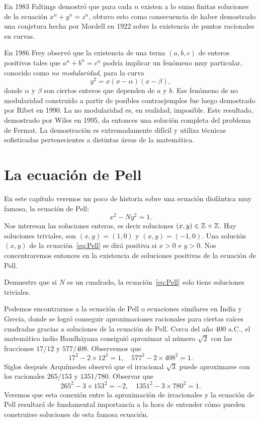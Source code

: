 En 1983 Faltings demostró que para cada $n$ existen a lo
sumo finitas soluciones de la ecuación $x^n+y^n=z^n$, obtuvo esto como
consecuencia de haber demostrado una conjetura hecha por Mordell en 1922 sobre
la existencia de puntos racionales en curvas. 

En 1986 Frey observó que la
existencia de una terna $(a,b,c)$ de enteros positivos tales que $a^n+b^n=c^n$
podría implicar un fenómeno muy particular, conocido como \emph{no
modularidad}, para la curva
\[
	y^2=x(x-\alpha)(x-\beta),
\]
donde $\alpha$ y $\beta$ son ciertos enteros que dependen de $a$ y $b$. 
Ese fenómeno de no modularidad construido a partir de posibles
contraejemplos fue luego demostrado por Ribet en 1990. La no modularidad es, en
realidad, imposible. Este resultado, demostrado por Wiles en 1995, da 
entonces una solución completa del problema de Fermat.
La demostración es extremadamente difícil y utiliza
técnicas sofisticadas pertenecientes a distintas áreas de la matemática.  

\section*{La ecuación de Pell}

En este capítulo veremos un poco de historia sobre una ecuación diofántica muy
famosa, la ecuación de Pell:
\begin{equation}
	\label{eq:Pell}
	x^2-Ny^2=1.
\end{equation}
Nos interesan las soluciones enteras, es decir soluciones $(x,y)\in\mathbb{Z}\times\mathbb{Z}$.
Hay soluciones triviales, son $(x,y)=(1,0)$ y $(x,y)=(-1,0)$. Una solución
$(x,y)$ de la ecuación~\eqref{eq:Pell} se dirá positiva si $x>0$ e $y>0$. Nos
concentraremos entonces en la existencia de soluciones positivas de la ecuación
de Pell.

\begin{exercise}
	Demuestre que si $N$ es un cuadrado, la ecuación~\eqref{eq:Pell} solo
	tiene soluciones triviales.
\end{exercise}

Podemos encontrarnos a la ecuación de Pell o ecuaciones similares en India y
Grecia, donde se logró conseguir aproximaciones racionales para ciertas raíces
cuadradas gracias a soluciones de la ecuación de Pell. 
Cerca del año 400 a.C., el matemático
indio Baudh\=ayana consiguió aproximar al número $\sqrt{2}$ con las fracciones
$17/12$ y $577/408$. Observemos que 
\[
	17^2-2\times 12^2=1,\quad
	577^2-2\times 408^2=1.
\]
Siglos después Arquímedes observó que el irracional $\sqrt{3}$ puede
aproximarse con los racionales $265/153$ y $1351/780$. Observar que
\[
	265^2-3\times 153^2=-2,\quad
	1351^2-3\times 780^2=1. 
\]
Veremos que esta
conexión entre la aproximación de irracionales y la ecuación de Pell resultará
de fundamental importancia a la hora de entender cómo pueden construirse
soluciones de esta famosa ecuación.  
	
